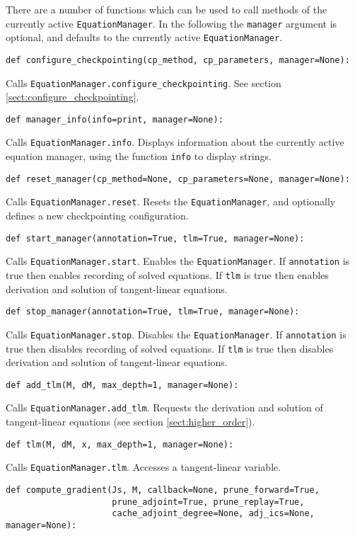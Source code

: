 \documentclass[11pt]{article}
\begin{document}
There are a number of functions which can be used to call methods of the
currently active \texttt{EquationManager}. In the following the
\texttt{manager} argument is optional, and defaults to the currently active
\texttt{EquationManager}.
\begin{lstlisting}
def configure_checkpointing(cp_method, cp_parameters, manager=None):
\end{lstlisting}
Calls \texttt{EquationManager.configure\_checkpointing}. See section
\ref{sect:configure_checkpointing}.
\begin{lstlisting}
def manager_info(info=print, manager=None):
\end{lstlisting}
Calls \texttt{EquationManager.info}. Displays information about the currently
active equation manager, using the function \texttt{info} to display strings.
\begin{lstlisting}
def reset_manager(cp_method=None, cp_parameters=None, manager=None):
\end{lstlisting}
Calls \texttt{EquationManager.reset}. Resets the \texttt{EquationManager}, and
optionally defines a new checkpointing configuration.
\begin{lstlisting}
def start_manager(annotation=True, tlm=True, manager=None):
\end{lstlisting}
Calls \texttt{EquationManager.start}. Enables the \texttt{EquationManager}. If
\texttt{annotation} is true then enables recording of solved equations. If
\texttt{tlm} is true then enables derivation and solution of tangent-linear
equations.
\begin{lstlisting}
def stop_manager(annotation=True, tlm=True, manager=None):
\end{lstlisting}
Calls \texttt{EquationManager.stop}. Disables the \texttt{EquationManager}. If
\texttt{annotation} is true then disables recording of solved equations. If
\texttt{tlm} is true then disables derivation and solution of tangent-linear
equations.
\begin{lstlisting}
def add_tlm(M, dM, max_depth=1, manager=None):
\end{lstlisting}
Calls \texttt{EquationManager.add\_tlm}. Requests the derivation and solution
of tangent-linear equations (see section \ref{sect:higher_order}).
\begin{lstlisting}
def tlm(M, dM, x, max_depth=1, manager=None):
\end{lstlisting}
Calls \texttt{EquationManager.tlm}. Accesses a tangent-linear variable.
\begin{lstlisting}
def compute_gradient(Js, M, callback=None, prune_forward=True,
                     prune_adjoint=True, prune_replay=True,
                     cache_adjoint_degree=None, adj_ics=None, manager=None):
\end{lstlisting}
\end{document}
